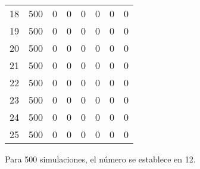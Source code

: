 \begin{table}[h]
{\begin{tabular}{|c|c|c|c|c|c|c|c|}
18 & 500 & 0 & 0 & 0 & 0 & 0 & 0 \\
19 & 500 & 0 & 0 & 0 & 0 & 0 & 0 \\
20 & 500 & 0 & 0 & 0 & 0 & 0 & 0 \\
21 & 500 & 0 & 0 & 0 & 0 & 0 & 0 \\
22 & 500 & 0 & 0 & 0 & 0 & 0 & 0 \\
23 & 500 & 0 & 0 & 0 & 0 & 0 & 0 \\
24 & 500 & 0 & 0 & 0 & 0 & 0 & 0 \\
25 & 500 & 0 & 0 & 0 & 0 & 0 & 0 \\ \hline
\end{tabular}%
}
\end{table}

Para 500 simulaciones, el número se establece en 12.

